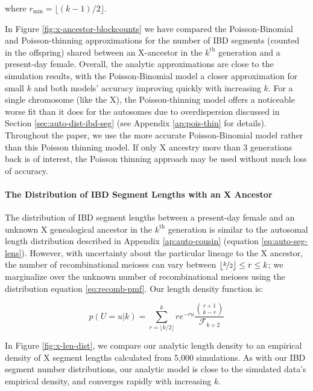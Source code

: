 \documentclass[9pt,twocolumn,twoside]{gsajnl}
\begin{document}
where $r_\text{min} = \lfloor (k-1)/2 \rfloor$.

In Figure \ref{fig:x-ancestor-blockcounts} we have compared the
Poisson-Binomial and Poisson-thinning approximations for the number of IBD
segments (counted in the offspring) shared between an X-ancestor in the
$k^\text{th}$ generation and a present-day female. Overall, the analytic
approximations are close to the simulation results, with the Poisson-Binomial
model a closer approximation for small $k$ and both models' accuracy improving
quickly with increasing $k$.  For a single chromosome (like the X), the
Poisson-thinning model offers a noticeable worse fit than it does for the
autosomes due to overdispersion discussed in Section
\ref{sec:auto-dist-ibd-seg} (see Appendix \ref{ap:pois-thin} for details).
Throughout the paper, we use the more accurate Poisson-Binomial model rather
than this Poisson thinning model. If only X ancestry more than 3 generations
back is of interest, the Poisson thinning approach may be used without much
loss of accuracy.


\paragraph{The Distribution of IBD Segment Lengths with an X Ancestor}

The distribution of IBD segment lengths between a present-day female and an
unknown X genealogical ancestor in the $k^\text{th}$ generation is similar to
the autosomal length distribution described in Appendix \ref{ap:auto-cousin}
(equation \ref{eq:auto-seg-lens}). However, with uncertainty about the
particular lineage to the X ancestor, the number of recombinational meioses can
vary between $\lfloor \nicefrac{k}{2} \rfloor \le r \le k$; we marginalize over
the unknown number of recombinational meioses using the distribution equation
\eqref{eq:recomb-pmf}. Our length density function is:

\begin{equation}
  \label{eq:x-anc-length}
  p(U = u | k) = \sum_{r=\lfloor k/2 \rfloor}^k  r e^{-ru} \frac{{r+1 \choose k-r}}{\mathcal{F}_{k+2}} 
\end{equation}

In Figure \ref{fig:x-len-dist}, we compare our analytic length density to an
empirical density of X segment lengths calculated from 5,000 simulations. As
with our IBD segment number distributions, our analytic model is close to the
simulated data's empirical density, and converges rapidly with increasing $k$.
\end{document}
